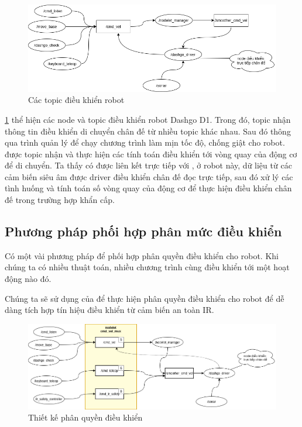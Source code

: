 \begin{figure}[htbp]
    \centering
    \includegraphics[width=\linewidth]{figures/phanquyen-goc.png}   
    \caption{Các topic điều khiển robot}
    \label{fig:phanquyen-goc}
\end{figure}

\figurename{\ref{fig:phanquyen-goc}} thể hiện các node và topic điều khiển robot Dashgo D1. Trong đó, topic  nhận thông tin điều khiển di chuyển chân đế từ nhiều topic khác nhau. Sau đó thông qua trình quản lý  để chạy chương trình làm mịn tốc độ, chống giật cho robot.  được topic  nhận và thực hiện các tính toán điều khiển tới vòng quay của động cơ để di chuyển. 
Ta thấy có  được liên kết trực tiếp với , ở robot này, dữ liệu từ các cảm biến siêu âm được driver điều khiển chân đế đọc trực tiếp, sau đó xử lý các tình huống và tính toán số vòng quay của động cơ để thực hiện điều khiển chân đế trong trường hợp khẩn cấp.

\subsection{Phương pháp phối hợp phân mức điều khiển}
Có một vài phương pháp để phối hợp phân quyền điều khiển cho robot. Khi chúng ta có nhiều thuật toán, nhiều chương trình cùng điều khiển tới một hoạt động nào đó. 

Chúng ta sẽ sử dụng  của  để thực hiện phân quyền điều khiển cho robot để dễ dàng tích hợp tín hiệu điều khiển từ cảm biến an toàn IR.

\begin{figure}[htbp]
    \centering
    \includegraphics[width=\linewidth]{figures/phanquen-dexuat.png}
    \caption{Thiết kế phân quyền điều khiển}
    \label{fig:phanquen-dexuat}
\end{figure}
